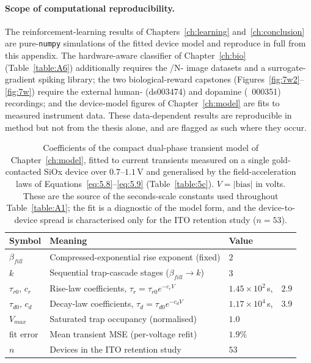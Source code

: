 \paragraph{Scope of computational reproducibility.} The reinforcement-learning results
of Chapters~\ref{ch:learning} and~\ref{ch:conclusion} are pure-\texttt{numpy}
simulations of the fitted device model and reproduce in full from this appendix. The
hardware-aware classifier of Chapter~\ref{ch:bio} (Table~\ref{table:A6}) additionally
requires the /N- image datasets and a surrogate-gradient
spiking library; the two biological-reward capstones
(Figures~\ref{fig:7w2}--\ref{fig:7w}) require the external human-
(ds003474) and dopamine (~000351) recordings; and the device-model
figures of Chapter~\ref{ch:model} are fits to measured instrument data. These
data-dependent results are reproducible in method but not from the thesis alone, and
are flagged as such where they occur.

\begin{table}[htbp!]
    \caption[Fitted device-model coefficients (Chapter~\ref{ch:model}).]{Coefficients
    of the compact dual-phase transient model of Chapter~\ref{ch:model}, fitted to
    current transients measured on a single gold-contacted SiOx device over
    $0.7$--$1.1$\,V and generalised by the field-acceleration laws of
    Equations~\ref{eq:5.8}--\ref{eq:5.9} (Table~\ref{table:5c}). $V=|\text{bias}|$ in
    volts. These are the source of the seconds-scale constants used throughout
    Table~\ref{table:A1}; the fit is a diagnostic of the model form, and the
    device-to-device spread is characterised only for the ITO retention study
    ($n=53$).}
    \begin{center}
    \small
    \begin{tabularx}{\textwidth}{@{}l X l@{}}
    \toprule
    Symbol & Meaning & Value \\
    \midrule
    $\beta_{fill}$   & Compressed-exponential rise exponent (fixed)     & $2$ \\
    $k$              & Sequential trap-cascade stages ($\beta_{fill}\!\to\!k$) & $3$ \\
    $\tau_{r0},\,c_r$ & Rise-law coefficients, $\tau_r=\tau_{r0}e^{-c_rV}$ & $1.45\times10^{2}$\,s,\ \ $2.9$ \\
    $\tau_{d0},\,c_d$ & Decay-law coefficients, $\tau_d=\tau_{d0}e^{-c_dV}$ & $1.17\times10^{4}$\,s,\ \ $3.9$ \\
    $V_{max}$        & Saturated trap occupancy (normalised)            & $1.0$ \\
    fit error        & Mean transient MSE (per-voltage refit)           & $1.9\%$ \\
    $n$              & Devices in the ITO retention study               & $53$ \\
    \bottomrule
    \end{tabularx}
    \label{table:A0}
    \end{center}
    \vspace*{-\baselineskip}
\end{table}

